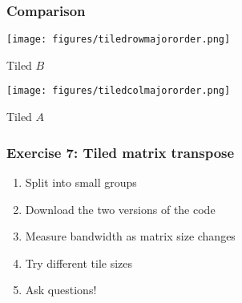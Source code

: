\documentclass[dvipsnames,presentation,aspectratio=169,14pt]{beamer}
\begin{document}
\begin{frame}
  \frametitle{Comparison }
  \begin{center}
    \begin{minipage}[t][\parskip][t]{0.4\textwidth}
      \texttt{[image: figures/tiledrowmajororder.png]}
      \centering

      Tiled $B$
    \end{minipage}
    \qquad
    \begin{minipage}[t][\parskip][t]{0.4\textwidth}
      \texttt{[image: figures/tiledcolmajororder.png]}
      \centering

      Tiled $A$
    \end{minipage}
  \end{center}
\end{frame}

\begin{frame}
  \frametitle{Exercise 7: Tiled matrix transpose}
  \begin{enumerate}[itemsep=8pt]
  \item Split into small groups
  \item Download the two versions of the code
  \item Measure bandwidth as matrix size changes
  \item Try different tile sizes
  \item Ask questions!
  \end{enumerate}
\end{frame}
\end{document}

